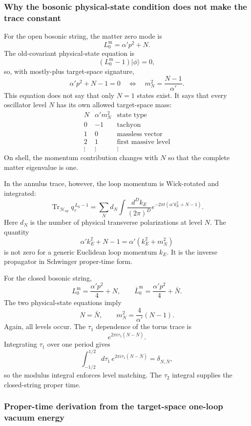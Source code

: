 \documentclass[
  10pt,
  a4paper,
  openany]{book}
\begin{document}
\subsubsection{Why the bosonic physical-state condition does not make
the trace
constant}\label{why-the-bosonic-physical-state-condition-does-not-make-the-trace-constant}

For the open bosonic string, the matter zero mode is \[
L_0^{\mathrm m}
=
\alpha'p^2+N.
\] The old-covariant physical-state equation is \[
(L_0^{\mathrm m}-1)|\phi\rangle=0,
\] so, with mostly-plus target-space signature, \[
\alpha'p^2+N-1=0
\quad\Longleftrightarrow\quad
m_N^2=\frac{N-1}{\alpha'}.
\] This equation does not say that only \(N=1\) states exist. It says
that every oscillator level \(N\) has its own allowed target-space mass:
\[
\begin{array}{c|c|c}
N&\alpha'm_N^2&\text{state type}\\
\hline
0&-1&\text{tachyon}\\
1&0&\text{massless vector}\\
2&1&\text{first massive level}\\
\vdots&\vdots&\vdots
\end{array}
\] On shell, the momentum contribution changes with \(N\) so that the
complete matter eigenvalue is one.

In the annulus trace, however, the loop momentum is Wick-rotated and
integrated: \[
\operatorname{Tr}_{\mathcal H_{\mathrm{op}}}
q_\tau^{\,L_0-1}
=
\sum_N d_N
\int\frac{d^Dk_E}{(2\pi)^D}
e^{-2\pi t(\alpha'k_E^2+N-1)}.
\] Here \(d_N\) is the number of physical transverse polarizations at
level \(N\). The quantity \[
\alpha'k_E^2+N-1
=
\alpha'(k_E^2+m_N^2)
\] is not zero for a generic Euclidean loop momentum \(k_E\). It is the
inverse propagator in Schwinger proper-time form.

For the closed bosonic string, \[
L_0^{\mathrm m}
=
\frac{\alpha'p^2}{4}+N,
\qquad
\bar L_0^{\mathrm m}
=
\frac{\alpha'p^2}{4}+\bar N.
\] The two physical-state equations imply \[
N=\bar N,
\qquad
m_N^2=\frac{4}{\alpha'}(N-1).
\] Again, all levels occur. The \(\tau_1\) dependence of the torus trace
is \[
e^{2\pi i\tau_1(N-\bar N)}.
\] Integrating \(\tau_1\) over one period gives \[
\int_{-1/2}^{1/2}d\tau_1\,
e^{2\pi i\tau_1(N-\bar N)}
=
\delta_{N,\bar N},
\] so the modulus integral enforces level matching. The \(\tau_2\)
integral supplies the closed-string proper time.

\subsubsection{Proper-time derivation from the target-space one-loop
vacuum
energy}\label{proper-time-derivation-from-the-target-space-one-loop-vacuum-energy}
\end{document}
